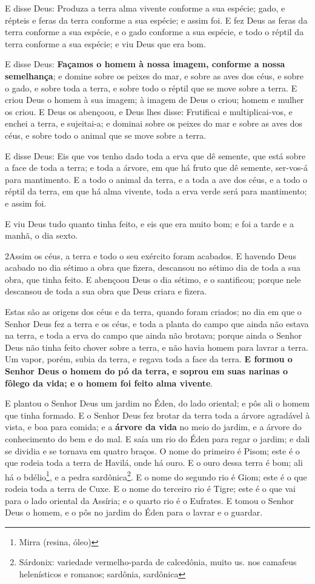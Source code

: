 E disse Deus: Produza a terra alma vivente conforme a sua
espécie; gado, e répteis e feras da terra conforme a sua espécie; e
assim foi. E fez Deus as feras da terra conforme a sua
espécie, e o gado conforme a sua espécie, e todo o réptil da terra
conforme a sua espécie; e viu Deus que era bom.

E disse Deus: \textbf{Façamos o homem à nossa imagem, conforme a
nossa semelhança}; e domine sobre os peixes do mar, e sobre as aves
dos céus, e sobre o gado, e sobre toda a terra, e sobre todo o
réptil que se move sobre a terra. E criou Deus o homem à sua
imagem; à imagem de Deus o criou; homem e mulher os criou. E
Deus os abençoou, e Deus lhes disse: Frutificai e multiplicai-vos, e
enchei a terra, e sujeitai-a; e dominai sobre os peixes do mar e
sobre as aves dos céus, e sobre todo o animal que se move sobre a
terra.

E disse Deus: Eis que vos tenho dado toda a erva que dê semente,
que está sobre a face de toda a terra; e toda a árvore, em que há
fruto que dê semente, ser-vos-á para mantimento. E a todo o
animal da terra, e a toda a ave dos céus, e a todo o réptil da
terra, em que há alma vivente, toda a erva verde será para
mantimento; e assim foi.

E viu Deus tudo quanto tinha feito, e eis que era muito bom; e
foi a tarde e a manhã, o dia sexto.

\smallskip

\lettrine{2} Assim os céus, a terra e todo o seu exército
foram acabados. E havendo Deus acabado no dia sétimo a obra que
fizera, descansou no sétimo dia de toda a sua obra, que tinha feito.
E abençoou Deus o dia sétimo, e o santificou; porque nele
descansou de toda a sua obra que Deus criara e fizera.

Estas são as origens dos céus e da terra, quando foram criados; no
dia em que o Senhor Deus fez a terra e os céus, e toda a planta
do campo que ainda não estava na terra, e toda a erva do campo que
ainda não brotava; porque ainda o Senhor Deus não tinha feito chover
sobre a terra, e não havia homem para lavrar a terra. Um vapor,
porém, subia da terra, e regava toda a face da terra. \textbf{E
formou o Senhor Deus o homem do pó da terra, e soprou em suas
narinas o fôlego da vida; e o homem foi feito alma vivente}.

E plantou o Senhor Deus um jardim no Éden, do lado oriental; e pôs
ali o homem que tinha formado. E o Senhor Deus fez brotar da
terra toda a árvore agradável à vista, e boa para comida; e a
\textbf{árvore da vida} no meio do jardim, e a árvore do
conhecimento do bem e do mal. E saía um rio do Éden para
regar o jardim; e dali se dividia e se tornava em quatro braços.
O nome do primeiro é Pisom; este é o que rodeia toda a terra
de Havilá, onde há ouro. E o ouro dessa terra é bom; ali há o
bdélio\footnote{Mirra (resina, óleo)}, e a pedra
sardônica\footnote{Sárdonix: variedade vermelho-parda de calcedônia,
muito us. nos camafeus helenísticos e romanos; sardônia, sardônica}.
E o nome do segundo rio é Giom; este é o que rodeia toda a
terra de Cuxe. E o nome do terceiro rio é Tigre; este é o que
vai para o lado oriental da Assíria; e o quarto rio é o Eufrates.
E tomou o Senhor Deus o homem, e o pôs no jardim do Éden para
o lavrar e o guardar.

